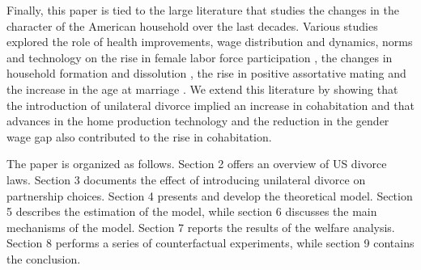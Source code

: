 \documentclass[12pt]{article}
\numberwithin{table}{section}
\begin{document}

Finally, this paper is tied to the large literature that studies the changes in the character of the American household over the last decades. Various studies explored the role of health improvements, wage distribution and dynamics, norms and technology on the rise in female labor force participation \citep{fernandez2004,greenwood2005,albanesi2016,greenwood2016}, the changes in household formation and dissolution \citep{greenwood2016,ciscato2019}, the rise in positive assortative mating \citep{fernandez2005,greenwood2016,ciscato2019} and the increase in the age at marriage \citep{santos2016}. We extend this literature by showing that the introduction of unilateral divorce implied an increase in cohabitation and that advances in the home production technology and the reduction in the gender wage gap also contributed to the rise in cohabitation.

The paper is organized as follows. Section 2 offers an overview of US divorce laws. Section 3 documents the effect of introducing unilateral divorce on partnership choices. Section 4 presents and develop the theoretical model. Section 5 describes the estimation of the model, while section 6 discusses the main mechanisms of the model. Section 7 reports the results of the welfare analysis. Section 8 performs a series of counterfactual experiments, while section 9 contains the conclusion.
\end{document}
